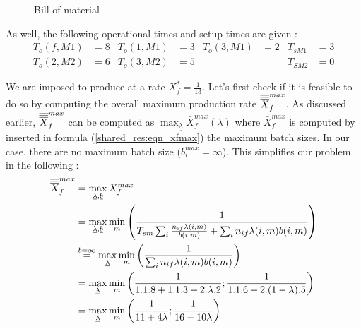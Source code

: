 \begin{wrapfigure}[11]{l}{5cm}
    \centering
    \caption{\label{shared_res:bom2}Bill of material}
\end{wrapfigure}

As well, the following operational times and setup times are given :
\begin{align*}
    T_o(f, M1) &= 8 &
    T_o(1, M1) &= 3 &
    T_o(3, M1) &= 2 &
    T_{sM1} &= 3\\
    T_o(2, M2) &= 6 &
    T_o(3, M2) &= 5 &
    &&
    T_{SM2} &= 0
\end{align*}

We are imposed to produce at a rate $X_f^* = \frac{1}{13}$. Let's first check if it is feasible to do so by computing the overall maximum production rate $\overline{\overline{\overline{X}}}_f^{max}$. As discussed earlier, $\overline{\overline{\overline{X}}}_f^{max}$ can be computed as $\max_{\underline\lambda}\bar X_f^{max}(\underline\lambda)$ where $\bar X_f^{max}$ is computed by inserted in formula (\ref{shared_res:eqn_xfmax}) the maximum batch sizes. In our case, there are no maximum batch size ($b^{max}_i = \infty$). This simplifies our problem in the following :
\[
    \begin{split}
        \overline{\overline{\overline{X}}}_f^{max} &= \max_{\underline\lambda, \underline b} X_f^{max}\\
        &= \max_{\underline\lambda, \underline b}\min_m\left( \frac{1}{ T_{sm}\sum_i\frac{n_{if}\lambda(i,m)}{b(i,m)} + \sum_i n_{if}\lambda(i,m)b(i,m) } \right)\\
        &\overset{b=\infty}{=} \max_{\underline\lambda}\min_m\left( \frac{1}{ \sum_i n_{if}\lambda(i,m)b(i,m) } \right) \\
        &= \max_{\underline\lambda} \min_m\left( \frac{1}{ 1.1.8 + 1.1.3 + 2.\lambda.2 } ; \frac{1}{ 1.1.6 + 2.(1-\lambda).5 } \right)\\
        &= \max_{\underline\lambda} \min_m\left( \frac{1}{ 11 + 4\lambda } ; \frac{1}{ 16 - 10\lambda } \right)
    \end{split} 
\]


